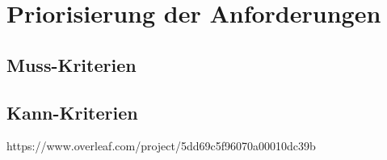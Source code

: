 \section{Priorisierung der Anforderungen}

\subsection{Muss-Kriterien}

\subsection{Kann-Kriterien}
https://www.overleaf.com/project/5dd69c5f96070a00010dc39b